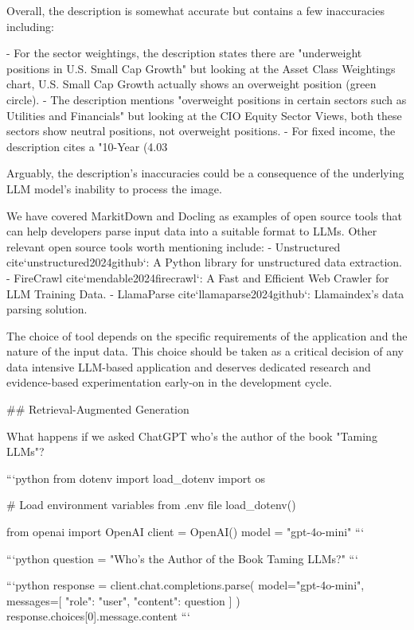 {{Overall, the description is somewhat accurate but contains a few inaccuracies including:

- For the sector weightings, the description states there are "underweight positions in U.S. Small Cap Growth" but looking at the Asset Class Weightings chart, U.S. Small Cap Growth actually shows an overweight position (green circle).
- The description mentions "overweight positions in certain sectors such as Utilities and Financials" but looking at the CIO Equity Sector Views, both these sectors show neutral positions, not overweight positions.
- For fixed income, the description cites a "10-Year (4.03%

Arguably, the description's inaccuracies could be a consequence of the underlying LLM model's inability to process the image.

We have covered MarkitDown and Docling as examples of open source tools that can help developers parse input data into a suitable format to LLMs. Other relevant open source tools worth mentioning include:
- Unstructured {cite}`unstructured2024github`: A Python library for unstructured data extraction.
- FireCrawl {cite}`mendable2024firecrawl`: A Fast and Efficient Web Crawler for LLM Training Data.
- LlamaParse {cite}`llamaparse2024github`: Llamaindex's data parsing solution.

The choice of tool depends on the specific requirements of the application and the nature of the input data. This choice should be taken as a critical decision of any data intensive LLM-based application and deserves dedicated research and evidence-based experimentation early-on in the development cycle.


## Retrieval-Augmented Generation

What happens if we asked ChatGPT who's the author of the book "Taming LLMs"?





```python
from dotenv import load_dotenv
import os

# Load environment variables from .env file
load_dotenv()

from openai import OpenAI
client = OpenAI()
model = "gpt-4o-mini"
```


```python
question = "Who's the Author of the Book Taming LLMs?"
```


```python
response = client.chat.completions.parse(
    model="gpt-4o-mini",
    messages=[
        {"role": "user", "content": question}
    ]
)
response.choices[0].message.content
```

}}
